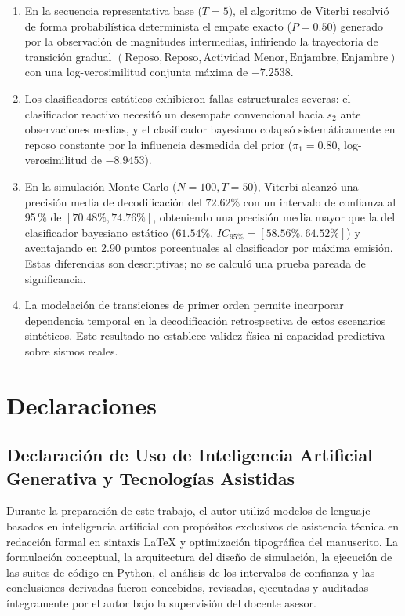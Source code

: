 \documentclass[11pt,a4paper]{article}
\begin{document}
\begin{enumerate}
    \item En la secuencia representativa base ($T=5$), el algoritmo de Viterbi resolvió de forma probabilística determinista el empate exacto ($P=0.50$) generado por la observación de magnitudes intermedias, infiriendo la trayectoria de transición gradual $(\text{Reposo}, \text{Reposo}, \text{Actividad Menor}, \text{Enjambre}, \text{Enjambre})$ con una log-verosimilitud conjunta máxima de $-7.2538$.
    \item Los clasificadores estáticos exhibieron fallas estructurales severas: el clasificador reactivo necesitó un desempate convencional hacia $s_2$ ante observaciones medias, y el clasificador bayesiano colapsó sistemáticamente en reposo constante por la influencia desmedida del prior ($\pi_1 = 0.80$, log-verosimilitud de $-8.9453$).
    \item En la simulación Monte Carlo ($N=100, T=50$), Viterbi alcanzó una precisión media de decodificación del $72.62\%$ con un intervalo de confianza al 95\,\% de $[70.48\%, 74.76\%]$, obteniendo una precisión media mayor que la del clasificador bayesiano estático ($61.54\%$, $IC_{95\%} = [58.56\%, 64.52\%]$) y aventajando en 2.90 puntos porcentuales al clasificador por máxima emisión. Estas diferencias son descriptivas; no se calculó una prueba pareada de significancia.
    \item La modelación de transiciones de primer orden permite incorporar dependencia temporal en la decodificación retrospectiva de estos escenarios sintéticos. Este resultado no establece validez física ni capacidad predictiva sobre sismos reales.
\end{enumerate}

\section*{Declaraciones}

\subsection*{Declaración de Uso de Inteligencia Artificial Generativa y Tecnologías Asistidas}
Durante la preparación de este trabajo, el autor utilizó modelos de lenguaje basados en inteligencia artificial con propósitos exclusivos de asistencia técnica en redacción formal en sintaxis LaTeX y optimización tipográfica del manuscrito. La formulación conceptual, la arquitectura del diseño de simulación, la ejecución de las suites de código en Python, el análisis de los intervalos de confianza y las conclusiones derivadas fueron concebidas, revisadas, ejecutadas y auditadas íntegramente por el autor bajo la supervisión del docente asesor.
\end{document}
